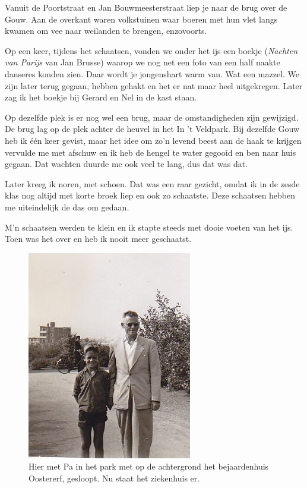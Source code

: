\documentclass[12pt,twoside, openright]{memoir}
\begin{document}
Vanuit de Poortstraat en Jan Bouwmeesterstraat liep je naar de brug over de Gouw. Aan de overkant waren volkstuinen waar boeren met hun vlet langs kwamen om vee naar weilanden te brengen, enzovoorts. 

Op een keer, tijdens het schaatsen, vonden we onder het ijs een boekje (\emph{Nachten van Parijs} van Jan Brusse) waarop we nog net een foto van een half naakte danseres konden zien. Daar wordt je jongenshart warm van. Wat een mazzel. We zijn later terug gegaan, hebben gehakt en het er nat maar heel uitgekregen. Later zag ik het boekje bij Gerard en Nel in de kast staan. 

Op dezelfde plek is er nog wel een brug, maar de omstandigheden zijn gewijzigd. De brug lag op de plek achter de heuvel in het In ’t Veldpark. Bij dezelfde Gouw heb ik één keer gevist, maar het idee om zo’n levend beest aan de haak te krijgen vervulde me met afschuw en ik heb de hengel te water gegooid en ben naar huis gegaan. Dat wachten duurde me ook veel te lang, dus dat was dat. 

Later kreeg ik noren, met schoen. Dat was een raar gezicht, omdat ik in de zesde klas nog altijd met korte broek liep en ook zo schaatste. Deze schaatsen hebben me uiteindelijk de das om gedaan. 

M’n schaatsen werden te klein en ik stapte steeds met dooie voeten van het ijs. Toen was het over en heb ik nooit meer geschaatst. 

\begin{figure}
\centering
\includegraphics[width=\textwidth]{img/ch13/metpa2}
\caption*{\footnotesize Hier met Pa in het park met op de achtergrond het bejaardenhuis Oostererf, gesloopt. Nu staat het ziekenhuis er.}
\end{figure}
\end{document}
